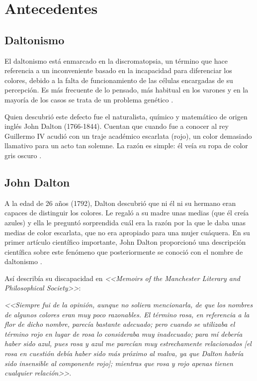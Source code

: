 \documentclass[10pt]{article}
\begin{document}
\section{Antecedentes}
\subsection{Daltonismo}
El daltonismo está enmarcado en la discromatopsia, un término que hace referencia a un inconveniente basado en la incapacidad para diferenciar los colores, debido a la falta de funcionamiento de las células encargadas de su percepción. Es más frecuente de lo pensado, más habitual en los varones y en la mayoría de los casos se trata de un problema genético \cite{IEEEreferencias:Ref1}\cite{IEEEreferencias:Ref2}.

\setlength{\parskip}{2mm}

Quien descubrió este defecto fue el naturalista, químico y matemático de origen inglés John Dalton (1766-1844).
Cuentan que cuando fue a conocer al rey Guillermo IV acudió con un traje académico escarlata (rojo), un color demasiado llamativo para un acto tan solemne. La razón es simple: él veía su ropa de color gris oscuro \cite{IEEEreferencias:Ref1}.

\subsection{John Dalton}

A la edad de 26 años (1792), Dalton descubrió que ni él ni su hermano eran capaces de distinguir los colores. Le regaló a su madre unas medias (que él creía azules) y ella le preguntó sorprendida cuál era la razón por la que le daba unas medias de color escarlata, que no era apropiado para una mujer cuáquera. En su primer artículo científico importante, John Dalton proporcionó una descripción científica sobre este fenómeno que posteriormente se conoció con el nombre de daltonismo \cite{IEEEreferencias:Ref1}.

\setlength{\parskip}{2mm}

Así describía su discapacidad en \textit{<<Memoirs of the Manchester Literary and Philosophical Society>>}:

\textit{<<Siempre fui de la opinión, aunque no soliera mencionarla, de que los nombres de algunos colores eran muy poco razonables. El término rosa, en referencia a la flor de dicho nombre, parecía bastante adecuado; pero cuando se utilizaba el término rojo en lugar de rosa lo consideraba muy inadecuado; para mí debería haber sido azul, pues rosa y azul me parecían muy estrechamente relacionados [el rosa en cuestión debía haber sido más próximo al malva, ya que Dalton habría sido insensible al componente rojo]; mientras que rosa y rojo apenas tienen cualquier relación>>}. 
\end{document}
